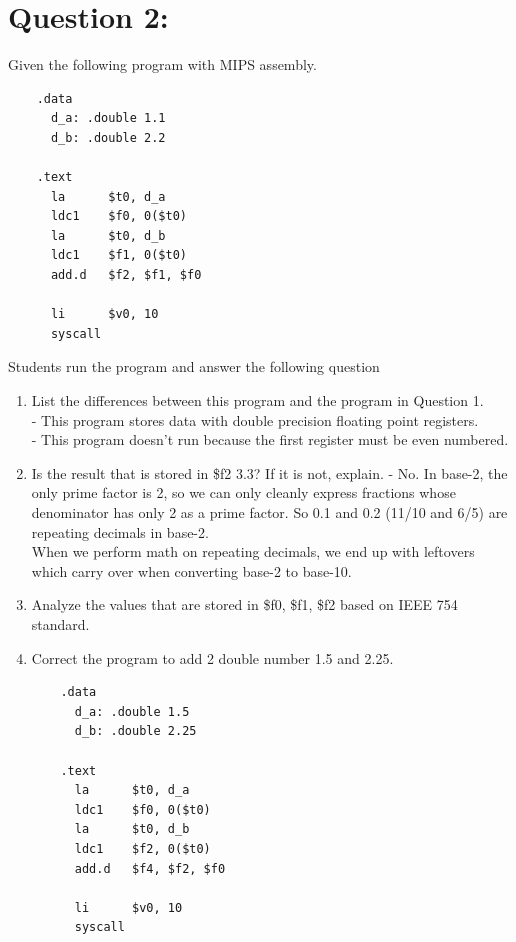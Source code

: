\documentclass[12pt,a4paper]{article}
\begin{document}
\section*{Question 2:}
Given the following program with MIPS assembly.
\begin{mdframed}[hidealllines=true,backgroundcolor=magenta!10]
  \begin{lstlisting}
    .data
      d_a: .double 1.1
      d_b: .double 2.2

    .text
      la      $t0, d_a
      ldc1    $f0, 0($t0)
      la      $t0, d_b
      ldc1    $f1, 0($t0)
      add.d   $f2, $f1, $f0

      li      $v0, 10
      syscall
  \end{lstlisting}
\end{mdframed}
Students run the program and answer the following question
\begin{enumerate}
  \item List the differences between this program and the program in Question 1. \\
        - This program stores data with double precision floating point registers. \\
        - This program doesn't run because the first register must be even numbered.
  \item Is the result that is stored in \$f2 3.3? If it is not, explain.
        - No. In base-2, the only prime factor is 2, so we can only cleanly express fractions whose denominator has only 2 as a prime factor.
        So 0.1 and 0.2 (11/10 and 6/5) are repeating decimals in base-2. \\
        When we perform math on repeating decimals, we end up with leftovers which carry over when converting base-2 to base-10.
  \item Analyze the values that are stored in \$f0, \$f1, \$f2 based on IEEE 754 standard.
  \item Correct the program to add 2 double number 1.5 and 2.25.
        \begin{mdframed}[hidealllines=true,backgroundcolor=magenta!10]
          \begin{lstlisting}
    .data
      d_a: .double 1.5
      d_b: .double 2.25

    .text
      la      $t0, d_a
      ldc1    $f0, 0($t0)
      la      $t0, d_b
      ldc1    $f2, 0($t0)
      add.d   $f4, $f2, $f0

      li      $v0, 10
      syscall
          \end{lstlisting}
        \end{mdframed}
\end{enumerate}
\end{document}
